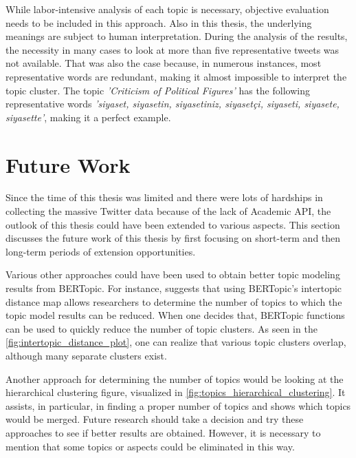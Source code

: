 While labor-intensive analysis of each topic is necessary, objective evaluation needs to be included in this approach. 
Also in this thesis, the underlying meanings are subject to human interpretation. During the 
analysis of the results, the necessity in many cases to look at more than five representative tweets was 
not available. That was also the case because, in numerous instances, most representative words are 
redundant, making it almost impossible to interpret the topic cluster. The topic 
\textit{'Criticism of Political Figures'} has the following representative words 
\textit{'siyaset, siyasetin, siyasetiniz, siyasetçi, siyaseti, siyasete, siyasette'}, making it a perfect 
example.

\section{Future Work}\label{section:future_work}


Since the time of this thesis was limited and there were lots of hardships in collecting the massive 
Twitter data because of the lack of Academic API, the outlook of this thesis could have been 
extended to various aspects. This section discusses the future work of this thesis by first focusing 
on short-term and then long-term periods of extension opportunities.

Various other approaches could have been used to obtain better topic modeling results from BERTopic. 
For instance, \textcite{topic_model_comparison_bertopic_2022} suggests that using BERTopic's 
intertopic distance map allows researchers to determine the number of topics to which the topic 
model results can be reduced. When one decides that, BERTopic functions can be used to quickly 
reduce the number of topic clusters. As seen in the \autoref{fig:intertopic_distance_plot}, 
one can realize that various topic clusters overlap, although many separate clusters exist. 

Another approach for determining the number of topics would be looking at the hierarchical 
clustering figure, visualized in \autoref{fig:topics_hierarchical_clustering}. It assists, 
in particular, in finding a proper number of topics and shows which topics would be merged.
Future research should take a decision and try these approaches to see if better results are 
obtained. However, it is necessary to mention that some topics or aspects could be eliminated in 
this way.

